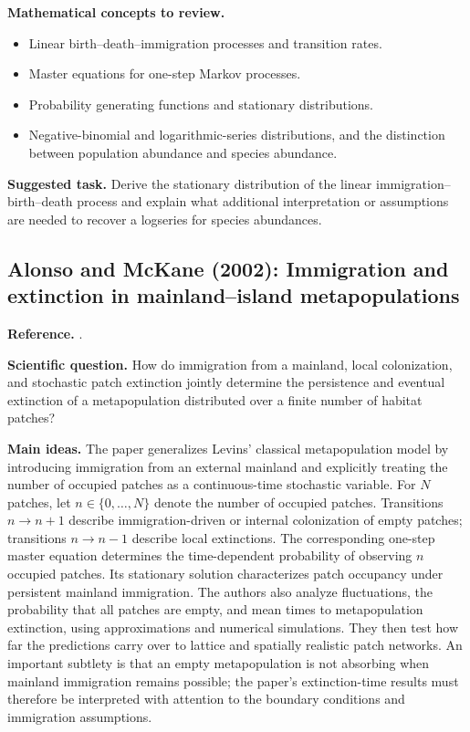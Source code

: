 \medskip\noindent\textbf{Mathematical concepts to review.}
\begin{itemize}
  \item Linear birth--death--immigration processes and transition rates.
  \item Master equations for one-step Markov processes.
  \item Probability generating functions and stationary distributions.
  \item Negative-binomial and logarithmic-series distributions, and the
        distinction between population abundance and species abundance.
\end{itemize}

\noindent\textbf{Suggested task.} Derive the stationary distribution of the
linear immigration--birth--death process and explain what additional
interpretation or assumptions are needed to recover a logseries for species
abundances.

\subsection{Alonso and McKane (2002): Immigration and extinction in mainland--island metapopulations}
\label{subsec:alonso-mckane-metapopulations}
\noindent\textbf{Reference.} \citet{AlonsoMcKane2002Extinction}.

\medskip\noindent\textbf{Scientific question.}
How do immigration from a mainland, local colonization, and stochastic patch
extinction jointly determine the persistence and eventual extinction of a
metapopulation distributed over a finite number of habitat patches?

\medskip\noindent\textbf{Main ideas.}
The paper generalizes Levins' classical metapopulation model by introducing
immigration from an external mainland and explicitly treating the number of
occupied patches as a continuous-time stochastic variable. For $N$ patches,
let $n\in\{0,\ldots,N\}$ denote the number of occupied patches. Transitions
$n\to n+1$ describe immigration-driven or internal colonization of empty
patches; transitions $n\to n-1$ describe local extinctions. The corresponding
one-step master equation determines the time-dependent probability of
observing $n$ occupied patches. Its stationary solution characterizes patch
occupancy under persistent mainland immigration. The authors also analyze
fluctuations, the probability that all patches are empty, and mean times to
metapopulation extinction, using approximations and numerical simulations.
They then test how far the predictions carry over to lattice and spatially
realistic patch networks. An important subtlety is that an empty
metapopulation is not absorbing when mainland immigration remains possible;
the paper's extinction-time results must therefore be interpreted with
attention to the boundary conditions and immigration assumptions.

